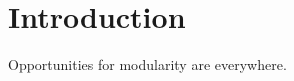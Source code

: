 \chapter{Introduction}
\label{sec:intro}
















Opportunities for modularity are everywhere.

